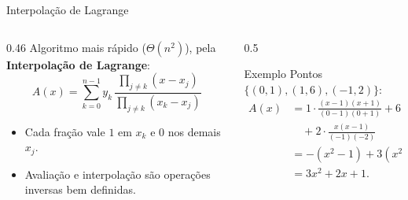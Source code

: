 \documentclass[aspectratio=169,10pt]{beamer}
\begin{document}
\begin{frame}{Interpolação de Lagrange}
  \begin{columns}[T]
    \begin{column}{0.46\textwidth}
      Algoritmo mais rápido ($\Theta(n^2)$), pela \textbf{Interpolação de Lagrange}:
      \[
        A(x) = \sum_{k=0}^{n-1} y_k \,
        \frac{\prod_{j\neq k}(x - x_j)}{\prod_{j\neq k}(x_k - x_j)}
      \]
      \begin{itemize}
        \item Cada fração vale $1$ em $x_k$ e $0$ nos demais $x_j$.
        \item Avaliação e interpolação são operações inversas bem definidas.
      \end{itemize}
    \end{column}
    \begin{column}{0.5\textwidth}
      \begin{exampleblock}{Exemplo}
        Pontos $\{(0,1),(1,6),(-1,2)\}$:
        \begin{align*}
          A(x) &= 1\cdot\frac{(x-1)(x+1)}{(0-1)(0+1)}
                 + 6\cdot\frac{x(x+1)}{(1)(2)}\\
               &\quad + 2\cdot\frac{x(x-1)}{(-1)(-2)}\\
               &= -(x^2-1) + 3(x^2+x) + (x^2-x)\\
               &= 3x^2 + 2x + 1. \
        \end{align*}
      \end{exampleblock}
    \end{column}
  \end{columns}
\end{frame}
\end{document}
